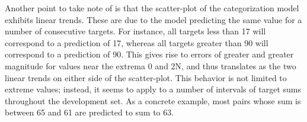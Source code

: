 \documentclass[twocolumn]{article}
\begin{document}
Another point to take note of is that the scatter-plot of the categorization model exhibits linear trends.
These are due to the model predicting the same value for a number of consecutive targets.
For instance, all targets less than 17 will correspond to a prediction of 17, whereas all targets greater than 90 will correspond to a prediction of 90.
This gives rise to errors of greater and greater magnitude for values near the extrema 0 and 2N, and thus translates as the two linear trends on either side of the scatter-plot.
This behavior is not limited to extreme values; instead, it seems to apply to a number of intervals of target sums throughout the development set.
As a concrete example, most pairs whose sum is between 65 and 61 are predicted to sum to 63.

\begin{table}%
    \centering
    \qquad
    \caption{\label{tab:topo} Topographic similarity scores}
\end{table}
\end{document}
